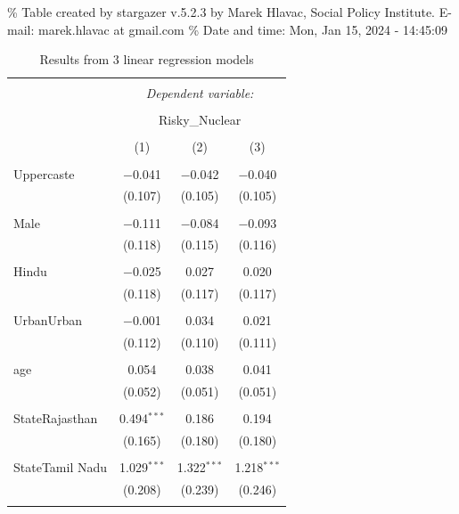 \documentclass[
]{article}
\begin{document}
\begingroup\setlength{\tabcolsep}{1pt}

\renewcommand{\arraystretch}{0.7}

\% Table created by stargazer v.5.2.3 by Marek Hlavac, Social Policy
Institute. E-mail: marek.hlavac at gmail.com \% Date and time: Mon, Jan
15, 2024 - 14:45:09

\begin{table}[!htbp] \centering 
  \caption{Results from 3 linear regression models} 
  \label{} 
\begin{tabular}{@{\extracolsep{5pt}}lccc} 
\\[-1.8ex]\hline 
\hline \\[-1.8ex] 
 & \multicolumn{3}{c}{\textit{Dependent variable:}} \\ 
\cline{2-4} 
\\[-1.8ex] & \multicolumn{3}{c}{Risky\_Nuclear} \\ 
\\[-1.8ex] & (1) & (2) & (3)\\ 
\hline \\[-1.8ex] 
 Uppercaste & $-$0.041 & $-$0.042 & $-$0.040 \\ 
  & (0.107) & (0.105) & (0.105) \\ 
  & & & \\ 
 Male & $-$0.111 & $-$0.084 & $-$0.093 \\ 
  & (0.118) & (0.115) & (0.116) \\ 
  & & & \\ 
 Hindu & $-$0.025 & 0.027 & 0.020 \\ 
  & (0.118) & (0.117) & (0.117) \\ 
  & & & \\ 
 UrbanUrban & $-$0.001 & 0.034 & 0.021 \\ 
  & (0.112) & (0.110) & (0.111) \\ 
  & & & \\ 
 age & 0.054 & 0.038 & 0.041 \\ 
  & (0.052) & (0.051) & (0.051) \\ 
  & & & \\ 
 StateRajasthan & 0.494$^{***}$ & 0.186 & 0.194 \\ 
  & (0.165) & (0.180) & (0.180) \\ 
  & & & \\ 
 StateTamil Nadu & 1.029$^{***}$ & 1.322$^{***}$ & 1.218$^{***}$ \\ 
  & (0.208) & (0.239) & (0.246) \\ 
  & & & \\ 

\end{tabular}
\end{table}
\end{document}
